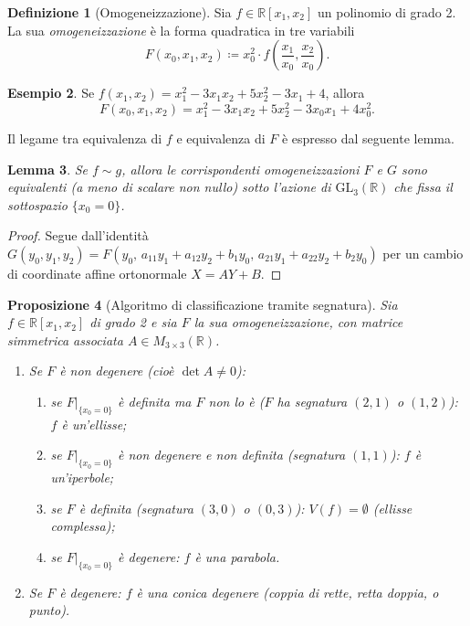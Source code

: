 \documentclass[11pt, a4paper]{book}
\theoremstyle{definition}
\newtheorem{definizione}{Definizione}[section]
\newtheorem{esempio}[definizione]{Esempio}
\theoremstyle{plain}
\newtheorem{proposizione}[definizione]{Proposizione}
\newtheorem{lemma}[definizione]{Lemma}
\theoremstyle{remark}
\newcommand{\R}{\mathbb{R}}
\newcommand{\GL}{\mathrm{GL}}
\begin{document}
\begin{defbox}
\begin{definizione}[Omogeneizzazione]
\label{def:omog}
Sia $f \in \R[x_1, x_2]$ un polinomio di grado 2. La sua \emph{omogeneizzazione} è la forma quadratica in tre variabili
\[
  F(x_0, x_1, x_2) \coloneqq x_0^2 \cdot f\!\left(\frac{x_1}{x_0}, \frac{x_2}{x_0}\right).
\]
\end{definizione}
\end{defbox}

\begin{esempio}
Se $f(x_1,x_2) = x_1^2 - 3x_1 x_2 + 5x_2^2 - 3x_1 + 4$, allora
\[
  F(x_0,x_1,x_2) = x_1^2 - 3x_1 x_2 + 5x_2^2 - 3x_0 x_1 + 4x_0^2.
\]
\end{esempio}

Il legame tra equivalenza di $f$ e equivalenza di $F$ è espresso dal seguente lemma.

\begin{lemma}
\label{lem:omog-equiv}
Se $f \sim g$, allora le corrispondenti omogeneizzazioni $F$ e $G$ sono equivalenti (a meno di scalare non nullo) sotto l'azione di $\GL_3(\R)$ che fissa il sottospazio $\{x_0 = 0\}$.
\end{lemma}

\begin{proof}
Segue dall'identità $G(y_0, y_1, y_2) = F(y_0,\, a_{11}y_1 + a_{12}y_2 + b_1 y_0,\, a_{21}y_1 + a_{22}y_2 + b_2 y_0)$ per un cambio di coordinate affine ortonormale $X = AY + B$.
\end{proof}

\begin{proposizione}[Algoritmo di classificazione tramite segnatura]
\label{prop:class-segn}
Sia $f \in \R[x_1,x_2]$ di grado 2 e sia $F$ la sua omogeneizzazione, con matrice simmetrica associata $A \in M_{3 \times 3}(\R)$.
\begin{enumerate}[label=(\Roman*)]
  \item Se $F$ è non degenere (cioè $\det A \neq 0$):
  \begin{enumerate}[label=(\alph*)]
    \item se $F|_{\{x_0=0\}}$ è definita ma $F$ non lo è ($F$ ha segnatura $(2,1)$ o $(1,2)$): $f$ è un'\emph{ellisse};
    \item se $F|_{\{x_0=0\}}$ è non degenere e non definita (segnatura $(1,1)$): $f$ è un'\emph{iperbole};
    \item se $F$ è definita (segnatura $(3,0)$ o $(0,3)$): $V(f) = \emptyset$ (ellisse complessa);
    \item se $F|_{\{x_0=0\}}$ è degenere: $f$ è una \emph{parabola}.
  \end{enumerate}
  \item Se $F$ è degenere: $f$ è una conica degenere (coppia di rette, retta doppia, o punto).
\end{enumerate}
\end{proposizione}
\end{document}
